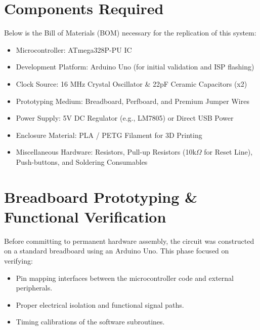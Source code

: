 \documentclass[11pt,a4paper]{article}
\begin{document}
\section{Components Required}
Below is the Bill of Materials (BOM) necessary for the replication of this system:
\begin{itemize}
    \item Microcontroller: ATmega328P-PU IC
    \item Development Platform: Arduino Uno (for initial validation and ISP flashing)
    \item Clock Source: 16 MHz Crystal Oscillator \& 22pF Ceramic Capacitors (x2)
    \item Prototyping Medium: Breadboard, Perfboard, and Premium Jumper Wires
    \item Power Supply: 5V DC Regulator (e.g., LM7805) or Direct USB Power
    \item Enclosure Material: PLA / PETG Filament for 3D Printing
    \item Miscellaneous Hardware: Resistors, Pull-up Resistors (10k$\Omega$ for Reset Line), Push-buttons, and Soldering Consumables
\end{itemize}

\section{Breadboard Prototyping \& Functional Verification}
Before committing to permanent hardware assembly, the circuit was constructed on a standard breadboard using an Arduino Uno. This phase focused on verifying:
\begin{itemize}
    \item Pin mapping interfaces between the microcontroller code and external peripherals.
    \item Proper electrical isolation and functional signal paths.
    \item Timing calibrations of the software subroutines.
\vspace{0.5cm}
\end{itemize}
\end{document}
